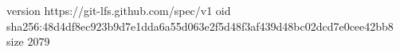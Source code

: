 version https://git-lfs.github.com/spec/v1
oid sha256:48d4df8ec923b9d7e1dda6a55d063e2f5d48f3af439d48bc02dcd7e0cee42bb8
size 2079
